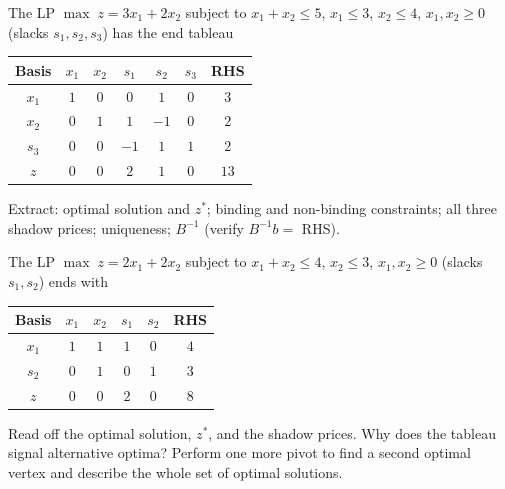 \begin{problems}
  \item The LP $\max\; z=3x_{1}+2x_{2}$ subject to $x_{1}+x_{2}\le 5$,
        $x_{1}\le 3$, $x_{2}\le 4$, $x_{1},x_{2}\ge 0$ (slacks
        $s_{1},s_{2},s_{3}$) has the end tableau
        \begin{center}
        \begin{tabular}{c|ccccc|c}
        Basis & $x_{1}$ & $x_{2}$ & $s_{1}$ & $s_{2}$ & $s_{3}$ & RHS\\
        \hline
        $x_{1}$ & $1$ & $0$ & $0$ & $1$ & $0$ & $3$\\
        $x_{2}$ & $0$ & $1$ & $1$ & $-1$ & $0$ & $2$\\
        $s_{3}$ & $0$ & $0$ & $-1$ & $1$ & $1$ & $2$\\
        \hline
        $z$ & $0$ & $0$ & $2$ & $1$ & $0$ & $13$\\
        \end{tabular}
        \end{center}
        Extract: optimal solution and $z^{*}$; binding and non-binding
        constraints; all three shadow prices; uniqueness; $B^{-1}$
        (verify $B^{-1}b=$ RHS).

  \item The LP $\max\; z=2x_{1}+2x_{2}$ subject to $x_{1}+x_{2}\le 4$,
        $x_{2}\le 3$, $x_{1},x_{2}\ge 0$ (slacks $s_{1},s_{2}$) ends with
        \begin{center}
        \begin{tabular}{c|cccc|c}
        Basis & $x_{1}$ & $x_{2}$ & $s_{1}$ & $s_{2}$ & RHS\\
        \hline
        $x_{1}$ & $1$ & $1$ & $1$ & $0$ & $4$\\
        $s_{2}$ & $0$ & $1$ & $0$ & $1$ & $3$\\
        \hline
        $z$ & $0$ & $0$ & $2$ & $0$ & $8$\\
        \end{tabular}
        \end{center}
        Read off the optimal solution, $z^{*}$, and the shadow prices. Why
        does the tableau signal alternative optima? Perform one more pivot
        to find a second optimal vertex and describe the whole set of
        optimal solutions.


\end{problems}
